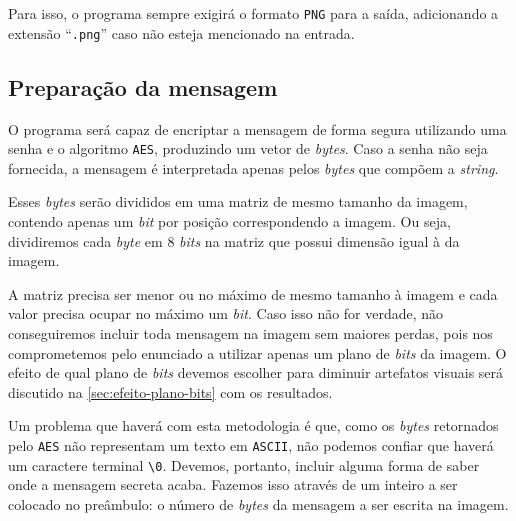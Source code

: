 \documentclass[brazilian,a4paper,twocolumn]{article}
\begin{document}
        Para isso, o programa sempre exigirá o formato \texttt{PNG} para a saída, adicionando a extensão ``\texttt{.png}'' caso não esteja mencionado na entrada.

    \subsection{Preparação da mensagem}

        O programa será capaz de encriptar a mensagem de forma segura utilizando uma senha e o algoritmo \texttt{AES}, produzindo um vetor de \textit{bytes}. Caso a senha não seja fornecida, a mensagem é interpretada apenas pelos \textit{bytes} que compõem a \textit{string}.

        Esses \textit{bytes} serão divididos em uma matriz de mesmo tamanho da imagem, contendo apenas um \textit{bit} por posição correspondendo a imagem. Ou seja, dividiremos cada \textit{byte} em 8 \textit{bits} na matriz que possui dimensão igual à da imagem.

        A matriz precisa ser menor ou no máximo de mesmo tamanho à imagem e cada valor precisa ocupar no máximo um \textit{bit}. Caso isso não for verdade, não conseguiremos incluir toda mensagem na imagem sem maiores perdas, pois nos comprometemos pelo enunciado a utilizar apenas um plano de \textit{bits} da imagem. O efeito de qual plano de \textit{bits} devemos escolher para diminuir artefatos visuais será discutido na \cref{sec:efeito-plano-bits} com os resultados.

        Um problema que haverá com esta metodologia é que, como os \textit{bytes} retornados pelo \texttt{AES} não representam um texto em \texttt{ASCII}, não podemos confiar que haverá um caractere terminal \texttt{\textbackslash0}. Devemos, portanto, incluir alguma forma de saber onde a mensagem secreta acaba. Fazemos isso através de um inteiro a ser colocado no preâmbulo: o número de \textit{bytes} da mensagem a ser escrita na imagem.

    \label{sec:efeito-plano-bits}
\end{document}
